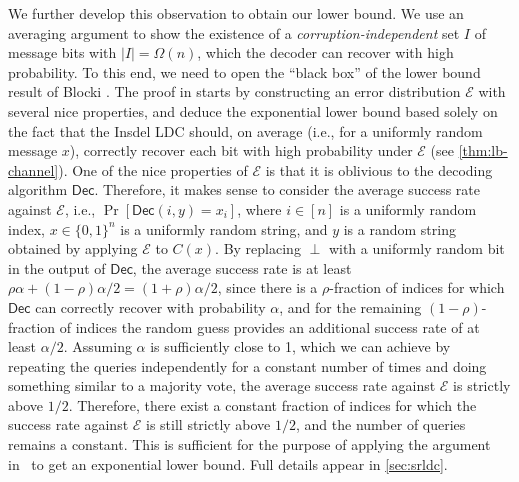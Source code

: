 \documentclass[10pt,a4paper]{article}
\theoremstyle{remark}
\newcommand{\etal}{\text{et al.}\xspace}
\newcommand{\zo}{\ensuremath{{\{0,1\}}}\xspace}
\def\+#1{\mathcal{#1}}
\newcommand{\Dec}{\ensuremath{\mathsf{Dec}}\xspace}
\begin{document}
We further develop this observation to obtain our lower bound. 
We use an averaging argument to show the existence of a \emph{corruption-independent} set $I$ of message bits with $|I|=\Omega(n)$, which the decoder can recover with high probability. To this end, we need to open the ``black box'' of the lower bound result of Blocki \etal \cite{blocki2021exponential}. The proof in \cite{blocki2021exponential} starts by constructing an error distribution $\+E$ with several nice properties, and deduce the exponential lower bound based solely on the fact that the Insdel LDC should, on average (i.e., for a uniformly random message $x$), correctly recover each bit with high probability under $\+E$ (see \cref{thm:lb-channel}). One of the nice properties of $\+E$ is that it is oblivious to the decoding algorithm $\Dec$. Therefore, it makes sense to consider the average success rate against $\+E$, i.e., $\Pr[\Dec(i,y)=x_i]$, where $i \in [n]$ is a uniformly random index, $x \in \zo^n$ is a uniformly random string, and $y$ is a random string obtained by applying $\+E$ to $C(x)$. By replacing $\perp$ with a uniformly random bit in the output of $\Dec$, the average success rate is at least $\rho\alpha+(1-\rho)\alpha/2=(1+\rho)\alpha/2$, since there is a $\rho$-fraction of indices for which $\Dec$ can correctly recover with probability $\alpha$, and for the remaining $(1-\rho)$-fraction of indices the random guess provides an additional success rate of at least $\alpha/2$. Assuming $\alpha$ is sufficiently close to 1, which we can achieve by repeating the queries independently for a constant number of times and doing something similar to a majority vote, the average success rate against $\+E$ is strictly above $1/2$. Therefore, there exist a constant fraction of indices for which the success rate against $\+E$ is still strictly above $1/2$, and the number of queries remains a constant. This is sufficient for the purpose of applying the argument in~\cite{blocki2021exponential} to get an exponential lower bound.
Full details appear in \cref{sec:srldc}.
\end{document}
